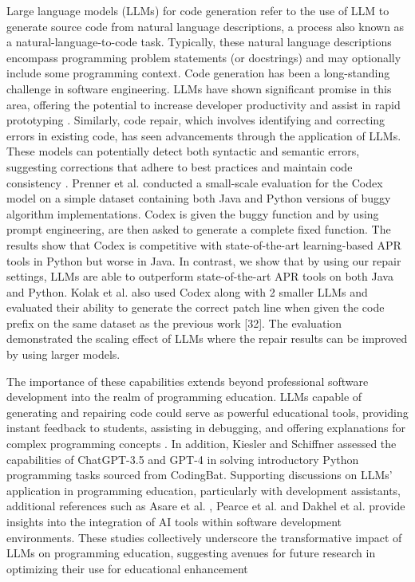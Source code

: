 \documentclass[sigconf,authordraft]{acmart}
\begin{document}
Large language models (LLMs) for code generation refer to the use of LLM to generate source code from natural language descriptions, a process also known as a natural-language-to-code task. Typically, these natural language descriptions encompass programming problem statements (or docstrings) and may optionally include some programming context. Code generation has been a long-standing challenge in software engineering. LLMs have shown significant promise in this area, offering the potential to increase developer productivity and assist in rapid prototyping \cite{10.5555/3618408.3618894,wu2024repoformerselectiveretrievalrepositorylevel,DBLP:conf/acl/LuDHGHS22}. Similarly, code repair, which involves identifying and correcting errors in existing code, has seen advancements through the application of LLMs. These models can potentially detect both syntactic and semantic errors, suggesting corrections that adhere to best practices and maintain code consistency \cite{DBLP:conf/icse/JiangL021, parasaram2024factselectionproblemllmbased, olausson2024selfrepairsilverbulletcode}. Prenner et al. \cite{10.1145/3524459.3527351} conducted a small-scale evaluation for the Codex model on a simple dataset containing both Java and Python versions of buggy algorithm implementations. Codex is given the buggy function and by using prompt engineering, are then asked to generate a complete fixed function. The results show that Codex is competitive with state-of-the-art learning-based APR tools in Python but worse in Java. In contrast, we show that by using our repair settings, LLMs are able to outperform state-of-the-art APR tools on both Java and Python. Kolak et al. \cite{osti_10340618} also used Codex along with 2 smaller LLMs and evaluated their ability to generate the correct patch line when given the code prefix on the same dataset as the previous work [32]. The evaluation demonstrated the scaling effect of LLMs where the repair results can be improved by using larger models.

The importance of these capabilities extends beyond professional software development into the realm of programming education. LLMs capable of generating and repairing code could serve as powerful educational tools, providing instant feedback to students, assisting in debugging, and offering explanations for complex programming concepts \cite{10.1145/3597503.3639219, 10.1145/3544548.3580919, 10.1145/3631802.3631806, 10.1145/3613904.3642706, jury2024evaluating}. In addition, Kiesler and Schiffner \cite{kiesler2023largelanguagemodelsintroductory} assessed the capabilities of ChatGPT-3.5 and GPT-4 in solving introductory Python programming tasks sourced from CodingBat. Supporting discussions on LLMs’ application in programming education, particularly with development assistants, additional references such as Asare et al. \cite{10.1007/s10664-023-10380-1}, Pearce et al. \cite{DBLP:conf/sp/PearceA0DK22} and Dakhel et al. \cite{DBLP:journals/jss/DakhelMNKDJ23} provide insights into the integration of AI tools within software development environments. These studies collectively underscore the transformative impact of LLMs on programming education, suggesting avenues for future research in optimizing their use for educational enhancement
\end{document}
